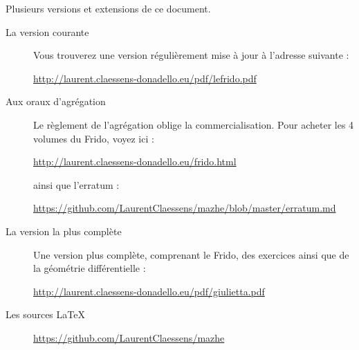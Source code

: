 

\thispagestyle{empty}

Plusieurs versions et extensions de ce document.
\begin{description}

    \item[La version courante]

        Vous trouverez une version régulièrement mise à jour à l'adresse suivante :
        \begin{center}
            \url{http://laurent.claessens-donadello.eu/pdf/lefrido.pdf}
        \end{center}

    \item[Aux oraux d'agrégation]

        Le règlement de l'agrégation oblige la commercialisation. Pour acheter les 4 volumes du Frido, voyez ici :
        \begin{center}
            \url{http://laurent.claessens-donadello.eu/frido.html}
        \end{center}
        ainsi que l'erratum :
        \begin{center}
            \url{https://github.com/LaurentClaessens/mazhe/blob/master/erratum.md}
        \end{center}

    \item[La version la plus complète]

        Une version plus complète, comprenant le Frido, des exercices ainsi que de la géométrie différentielle :
        \begin{center}
            \url{http://laurent.claessens-donadello.eu/pdf/giulietta.pdf}
        \end{center}

    \item[Les sources \LaTeX]
        \begin{center}
            \url{https://github.com/LaurentClaessens/mazhe}
        \end{center}
\end{description}
